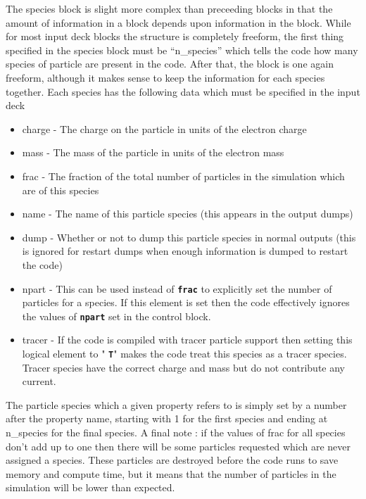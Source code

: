 \documentclass[12pt,a4paper]{article}
\newcommand{\inlinecode}[1]{{\color{warwickred} \bf\texttt{#1}}}
\begin{document}
The species block is slight more complex than preceeding blocks in that the
amount of information in a block depends upon information in the block. While
for most input deck blocks the structure is completely freeform, the first
thing specified in the species block must be ``n\_species'' which tells the
code how many species of particle are present in the code. After that, the
block is one again freeform, although it makes sense to keep the information
for each species together. Each species has the following data which must be
specified in the input deck\\
\begin{itemize}
\item charge - The charge on the particle in units of the electron charge
\item mass - The mass of the particle in units of the electron mass
\item frac - The fraction of the total number of particles in the simulation
  which are of this species
\item name - The name of this particle species (this appears in the output
  dumps)
\item dump - Whether or not to dump this particle species in normal outputs
  (this is ignored for restart dumps when enough information is dumped to
  restart the code)
\item npart - This can be used instead of \inlinecode{frac} to explicitly set
  the number of particles for a species. If this element is set then the code
  effectively ignores the values of \inlinecode{npart} set in the control
  block.
\item tracer - If the code is compiled with tracer particle support then
  setting this logical element to "\inlinecode{T}" makes the code treat this
  species as a tracer species. Tracer species have the correct charge and mass
  but do not contribute any current.
\end{itemize}

The particle species which a given property refers to is simply set by a
number after the property name, starting with 1 for the first species and
ending at n\_species for the final species. A final note : if the values of
frac for all species don't add up to one then there will be some particles
requested which are never assigned a species. These particles are destroyed
before the code runs to save memory and compute time, but it means that the
number of particles in the simulation will be lower than expected.\\
\end{document}
